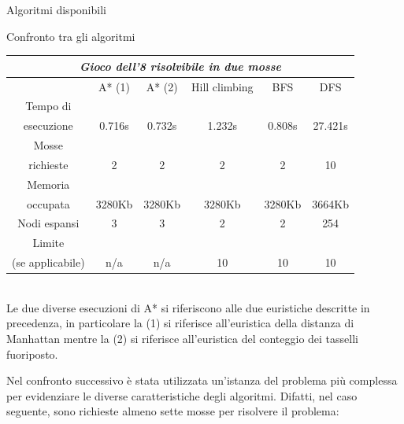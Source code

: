 \begin{chapter}{Algoritmi disponibili}
\begin{section}{Confronto tra gli algoritmi}
\begin{center}
    \label{tbl:confronto-algoritmi-1}
    \begin{tabular}{| c | c | c | c | c | c |}
    \hline
    \multicolumn{6}{|c|}{\textit{Gioco dell'8 risolvibile in due mosse}} \\
    \hline
                     & A* (1) & A* (2) & Hill climbing & BFS    & DFS     \\\hline
    Tempo di         &        &        &               &        &         \\
    esecuzione       & 0.716s & 0.732s & 1.232s        & 0.808s & 27.421s \\\hline
    Mosse            &        &        &               &        &         \\
    richieste        & 2      & 2      & 2             & 2      & 10      \\\hline
    Memoria          &        &        &               &        &         \\
    occupata         & 3280Kb & 3280Kb & 3280Kb        & 3280Kb & 3664Kb  \\\hline
    Nodi espansi     & 3      & 3      & 2             & 2      & 254     \\\hline
    Limite           &        &        &               &        &         \\
    (se applicabile) & n/a    & n/a    & 10            & 10     & 10      \\\hline
    \end{tabular}
\end{center}

\noindent \\Le due diverse esecuzioni di A* si riferiscono alle due euristiche
descritte in precedenza, in particolare la (1) si riferisce all'euristica della
distanza di Manhattan mentre la (2) si riferisce all'euristica del conteggio dei
tasselli fuoriposto.

Nel confronto successivo \`e stata utilizzata un'istanza del problema pi\`u
complessa per evidenziare le diverse caratteristiche degli algoritmi.
Difatti, nel caso seguente, sono richieste almeno sette mosse per risolvere il problema:


\end{section}
\end{chapter}
